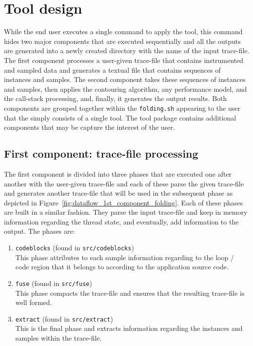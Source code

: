 
\chapter{Tool design}

While the end user executes a single command to apply the \FOLDING tool, this command hides two major components that are executed sequentially and all the outputs are generated into a newly created directory with the name of the input trace-file.
The first component processes a user-given trace-file that contains instrumented and sampled data and generates a textual file that contains sequences of instances and samples.
The second component takes these sequences of instances and samples, then applies the contouring algorithm, any performance model, and the call-stack processing, and, finally, it generates the output results.
Both components are grouped together within the \texttt{folding.sh} appearing to the user that the \FOLDING simply consists of a single tool.
The tool package contains additional components that may be capture the interest of the user.

\section{First component: trace-file processing}



The first component is divided into three phases that are executed one after another with the user-given trace-file and each of these parse the given trace-file and generates another trace-file that will be used in the subsequent phase as depicted in Figure~\ref{fig:dataflow_1st_component_folding}.
Each of these phases are built in a similar fashion.
They parse the input trace-file and keep in memory information regarding the thread state, and eventually, add information to the output.
The phases are:

\begin{enumerate}

	\item \texttt{codeblocks} (found in \texttt{src/codeblocks})\\
	This phase attributes to each sample information regarding to the loop / code region that it belongs to according to the application source code. 

	\item \texttt{fuse} (found in \texttt{src/fuse})\\
	This phase compacts the trace-file and ensures that the resulting trace-file is well formed.

	\item \texttt{extract} (found in \texttt{src/extract})\\
	This is the final phase and extracts information regarding the instances and samples within the trace-file.

\end{enumerate}

